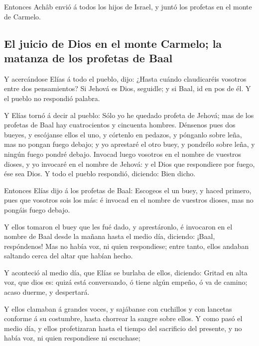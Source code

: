  Entonces Achâb envió á todos los hijos de Israel, y juntó
los profetas en el monte de Carmelo.

\hypertarget{el-juicio-de-dios-en-el-monte-carmelo-la-matanza-de-los-profetas-de-baal}{%
\subsection{El juicio de Dios en el monte Carmelo; la matanza de los
profetas de
Baal}\label{el-juicio-de-dios-en-el-monte-carmelo-la-matanza-de-los-profetas-de-baal}}

 Y acercándose Elías á todo el pueblo, dijo: ¿Hasta cuándo
claudicaréis vosotros entre dos pensamientos? Si Jehová es Dios,
seguidle; y si Baal, id en pos de él. Y el pueblo no respondió palabra.

 Y Elías tornó á decir al pueblo: Sólo yo he quedado
profeta de Jehová; mas de los profetas de Baal hay cuatrocientos y
cincuenta hombres.  Dénsenos pues dos bueyes, y escójanse
ellos el uno, y córtenlo en pedazos, y pónganlo sobre leña, mas no
pongan fuego debajo; y yo aprestaré el otro buey, y pondrélo sobre leña,
y ningún fuego pondré debajo.  Invocad luego vosotros en el
nombre de vuestros dioses, y yo invocaré en el nombre de Jehová: y el
Dios que respondiere por fuego, ése sea Dios. Y todo el pueblo
respondió, diciendo: Bien dicho.

 Entonces Elías dijo á los profetas de Baal: Escogeos el un
buey, y haced primero, pues que vosotros sois los más: é invocad en el
nombre de vuestros dioses, mas no pongáis fuego debajo.

 Y ellos tomaron el buey que les fué dado, y aprestáronlo,
é invocaron en el nombre de Baal desde la mañana hasta el medio día,
diciendo: ¡Baal, respóndenos! Mas no había voz, ni quien respondiese;
entre tanto, ellos andaban saltando cerca del altar que habían hecho.

 Y aconteció al medio día, que Elías se burlaba de ellos,
diciendo: Gritad en alta voz, que dios es: quizá está conversando, ó
tiene algún empeño, ó va de camino; acaso duerme, y despertará.

 Y ellos clamaban á grandes voces, y sajábanse con
cuchillos y con lancetas conforme á su costumbre, hasta chorrear la
sangre sobre ellos.  Y como pasó el medio día, y ellos
profetizaran hasta el tiempo del sacrificio del presente, y no había
voz, ni quien respondiese ni escuchase;

